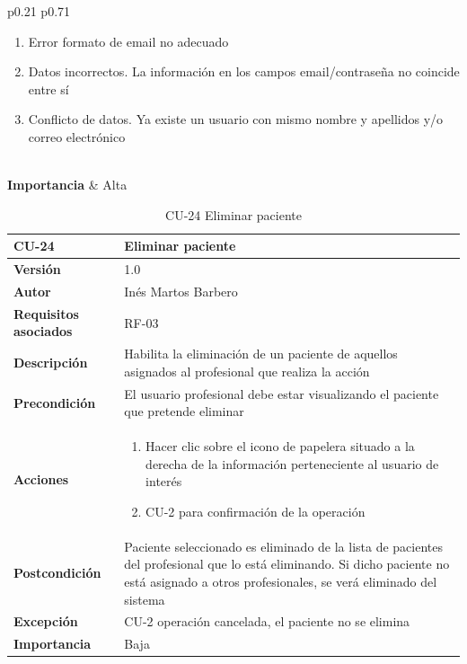\begin{table}[p]
\begin{tabularx}{\linewidth}{ p{0.21\columnwidth} p{0.71\columnwidth} }
\begin{enumerate}
            \item Error formato de email no adecuado
            \item Datos incorrectos. La información en los campos email/contraseña no coincide entre sí
            \item Conflicto de datos. Ya existe un usuario con mismo nombre y apellidos y/o correo electrónico
		\end{enumerate}\\
		\textbf{Importancia}          & Alta\\
		\bottomrule
	\end{tabularx}
	\caption{CU-23 Crear paciente}
    \label{CU-23}
\end{table}

\begin{table}[p]
	\centering
	\begin{tabularx}{\linewidth}{ p{} p{} }
		\toprule
		\textbf{CU-24}    & \textbf{Eliminar paciente}\\
		\toprule
		\textbf{Versión}              & 1.0    \\
		\textbf{Autor}                & Inés Martos Barbero \\
		\textbf{Requisitos asociados} & RF-03 \\
		\textbf{Descripción}          & Habilita la eliminación de un paciente de aquellos asignados al profesional que realiza la acción \\
		\textbf{Precondición}         & El usuario profesional debe estar visualizando el paciente que pretende eliminar \\
		\textbf{Acciones}             &
		\begin{enumerate}
			\def\labelenumi{\arabic{enumi}.}
			\tightlist
			\item Hacer clic sobre el icono de papelera situado a la derecha de la información perteneciente al usuario de interés
			\item CU-2 para confirmación de la operación
		\end{enumerate}\\
		\textbf{Postcondición}        & Paciente seleccionado es eliminado de la lista de pacientes del profesional que lo está eliminando. Si dicho paciente no está asignado a otros profesionales, se verá eliminado del sistema \\
		\textbf{Excepción}          & CU-2 operación cancelada, el paciente no se elimina \\
		\textbf{Importancia}          & Baja \\
		\bottomrule
	\end{tabularx}
	\caption{CU-24 Eliminar paciente}
    \label{CU-24}
\end{table}

